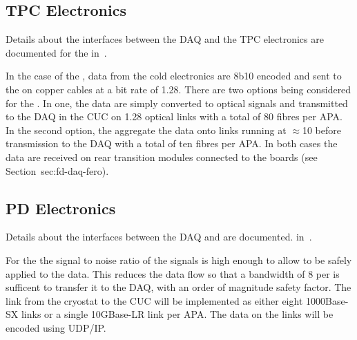 
\subsection{TPC Electronics}
\label{sec:fd-daq-intfc-elec}

Details about the interfaces between the DAQ and the TPC electronics
are documented for the  
in~\cite{docdb6742}.

In the case of the  , data from the cold
electronics  are 8b10 encoded and sent to the
 on copper cables at a bit rate of \SI{1.28}{\Gbps}. There
are two options being considered for the . In one, the
data are simply converted to optical signals and transmitted to the
DAQ in the CUC on \SI{1.28}{\Gbps} optical links with a total of 80
fibres per APA. In the second option, the  aggregate the
data onto links running at $\approx$\SI{10}{\Gbps} before transmission
to the DAQ with a total of ten fibres per APA. In both cases the data
are received on rear transition modules connected to the 
 boards (see Section~{sec:fd-daq-fero}).


\subsection{PD Electronics}
\label{sec:fd-daq-intfc-photon}

Details about the interfaces between the DAQ and 
 are documented. in~\cite{docdb6727}.


For the   the signal to noise ratio of the
 signals is high enough to allow  to be safely
applied to the data. This reduces the data flow so that a bandwidth of
\SI{8}{\Gbps} per  is sufficent to transfer it to the DAQ,
with an order of magnitude safety factor. The link from the 
cryostat to the CUC will be implemented as either eight 1000Base-SX
links or a single 10GBase-LR link per APA.
The data on the links will be encoded using UDP/IP.
